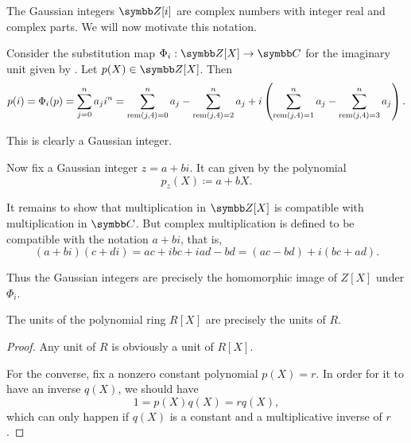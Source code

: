 \begin{example}\label{ex:polynomial_evaluation_gaussian_integers}
  The Gaussian integers \( \BZ[i] \) are complex numbers with integer real and complex parts. We will now motivate this notation.

  Consider the substitution map \( \Phi_i: \BZ[X] \to \BC \) for the imaginary unit given by . Let \( p(X) \in \BZ[X] \). Then
  \begin{equation*}
    p(i)
    =
    \Phi_i(p)
    =
    \sum_{j=0}^n a_j i^n
    =
    \sum_{\operatorname{rem}(j, 4) = 0}^n a_j - \sum_{\operatorname{rem}(j, 4) = 2}^n a_j + i \left(\sum_{\operatorname{rem}(j, 4) = 1}^n a_j - \sum_{\operatorname{rem}(j, 4) = 3}^n a_j \right).
  \end{equation*}

  This is clearly a Gaussian integer.

  Now fix a Gaussian integer \( z = a + bi \). It can given by the polynomial
  \begin{equation*}
    p_z(X) \coloneqq a + bX.
  \end{equation*}

  It remains to show that multiplication in \( \BZ[X] \) is compatible with multiplication in \( \BC \). But complex multiplication is defined to be compatible with the notation \( a + bi \), that is,
  \begin{equation*}
    (a + bi) (c + di)
    =
    ac + ibc + iad - bd
    =
    (ac - bd) + i(bc + ad).
  \end{equation*}

  Thus the Gaussian integers are precisely the homomorphic image of \( Z[X] \) under \( \Phi_i \).
\end{example}

\begin{proposition}\label{thm:polynomial_ring_units}
  The units of the polynomial ring \( R[X] \) are precisely the units of \( R \).
\end{proposition}
\begin{proof}
  Any unit of \( R \) is obviously a unit of \( R[X] \).

  For the converse, fix a nonzero constant polynomial \( p(X) = r \). In order for it to have an inverse \( q(X) \), we should have
  \begin{equation*}
    1 = p(X) q(X) = r q(X),
  \end{equation*}
  which can only happen if \( q(X) \) is a constant and a multiplicative inverse of \( r \).
\end{proof}

